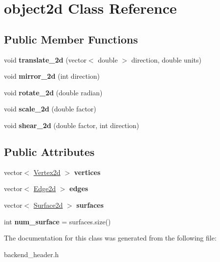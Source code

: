 \hypertarget{classobject2d}{}\section{object2d Class Reference}
\label{classobject2d}
\subsection*{Public Member Functions}
\begin{DoxyCompactItemize}
\item 
void {\bfseries translate\+\_\+2d} (vector$<$ double $>$ direction, double units)\hypertarget{classobject2d_abf951e0ca5d840dd5879b466c99b6fd4}{}\label{classobject2d_abf951e0ca5d840dd5879b466c99b6fd4}

\item 
void {\bfseries mirror\+\_\+2d} (int direction)\hypertarget{classobject2d_a8b862ee5cca04cc04633061db32ddf5c}{}\label{classobject2d_a8b862ee5cca04cc04633061db32ddf5c}

\item 
void {\bfseries rotate\+\_\+2d} (double radian)\hypertarget{classobject2d_a3d03fc8df42b272c5c323c2b9c3446d7}{}\label{classobject2d_a3d03fc8df42b272c5c323c2b9c3446d7}

\item 
void {\bfseries scale\+\_\+2d} (double factor)\hypertarget{classobject2d_ae9f4b0b6b7394692bc15763349f62c3c}{}\label{classobject2d_ae9f4b0b6b7394692bc15763349f62c3c}

\item 
void {\bfseries shear\+\_\+2d} (double factor, int direction)\hypertarget{classobject2d_a95c7fb5d8298b20b96f66775617a141c}{}\label{classobject2d_a95c7fb5d8298b20b96f66775617a141c}

\end{DoxyCompactItemize}
\subsection*{Public Attributes}
\begin{DoxyCompactItemize}
\item 
vector$<$ \hyperlink{classVertex2d}{Vertex2d} $>$ {\bfseries vertices}\hypertarget{classobject2d_aefee0f3de7d38c69206bbb59835846d6}{}\label{classobject2d_aefee0f3de7d38c69206bbb59835846d6}

\item 
vector$<$ \hyperlink{classEdge2d}{Edge2d} $>$ {\bfseries edges}\hypertarget{classobject2d_ab9edc7a08e953d11902081c8f7148e5b}{}\label{classobject2d_ab9edc7a08e953d11902081c8f7148e5b}

\item 
vector$<$ \hyperlink{classSurface2d}{Surface2d} $>$ {\bfseries surfaces}\hypertarget{classobject2d_a7326212b9e3e600da4c391787d37e923}{}\label{classobject2d_a7326212b9e3e600da4c391787d37e923}

\item 
int {\bfseries num\+\_\+surface} = surfaces.\+size()\hypertarget{classobject2d_a79f784a84ef728b54ab87159b108641b}{}\label{classobject2d_a79f784a84ef728b54ab87159b108641b}

\end{DoxyCompactItemize}


The documentation for this class was generated from the following file\+:\begin{DoxyCompactItemize}
\item 
backend\+\_\+header.\+h\end{DoxyCompactItemize}
